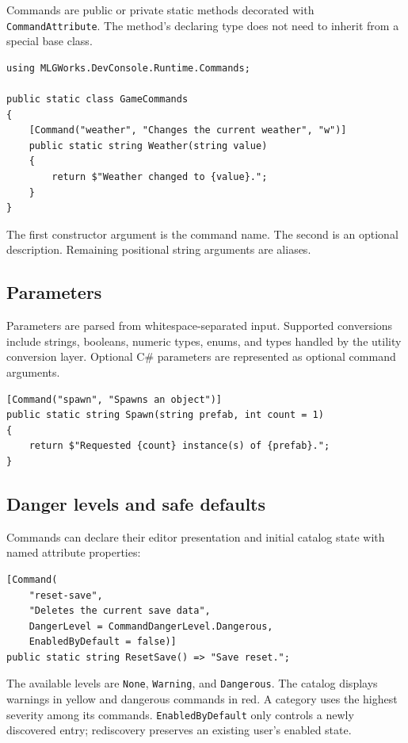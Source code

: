 \documentclass[11pt,a4paper]{article}
\begin{document}
Commands are public or private static methods decorated with \texttt{CommandAttribute}. The method's declaring type does not need to inherit from a special base class.

\begin{lstlisting}[style=csharp]
using MLGWorks.DevConsole.Runtime.Commands;

public static class GameCommands
{
    [Command("weather", "Changes the current weather", "w")]
    public static string Weather(string value)
    {
        return $"Weather changed to {value}.";
    }
}
\end{lstlisting}

The first constructor argument is the command name. The second is an optional description. Remaining positional string arguments are aliases.

\subsection{Parameters}

Parameters are parsed from whitespace-separated input. Supported conversions include strings, booleans, numeric types, enums, and types handled by the utility conversion layer. Optional C\# parameters are represented as optional command arguments.

\begin{lstlisting}[style=csharp]
[Command("spawn", "Spawns an object")]
public static string Spawn(string prefab, int count = 1)
{
    return $"Requested {count} instance(s) of {prefab}.";
}
\end{lstlisting}

\subsection{Danger levels and safe defaults}

Commands can declare their editor presentation and initial catalog state with named attribute properties:

\begin{lstlisting}[style=csharp]
[Command(
    "reset-save",
    "Deletes the current save data",
    DangerLevel = CommandDangerLevel.Dangerous,
    EnabledByDefault = false)]
public static string ResetSave() => "Save reset.";
\end{lstlisting}

The available levels are \texttt{None}, \texttt{Warning}, and \texttt{Dangerous}. The catalog displays warnings in yellow and dangerous commands in red. A category uses the highest severity among its commands. \texttt{EnabledByDefault} only controls a newly discovered entry; rediscovery preserves an existing user's enabled state.
\end{document}
